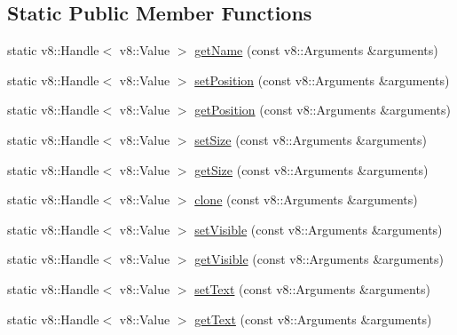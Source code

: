 \subsection*{Static Public Member Functions}
\begin{DoxyCompactItemize}
\item 
static v8\-::\-Handle$<$ v8\-::\-Value $>$ \hyperlink{class_rad_xml_1_1_app_object_class_ab8ecea2d5f0262244603882c1ad13cea}{get\-Name} (const v8\-::\-Arguments \&arguments)
\item 
static v8\-::\-Handle$<$ v8\-::\-Value $>$ \hyperlink{class_rad_xml_1_1_app_object_class_a798ac1626cea39cef105c114eadcd942}{set\-Position} (const v8\-::\-Arguments \&arguments)
\item 
static v8\-::\-Handle$<$ v8\-::\-Value $>$ \hyperlink{class_rad_xml_1_1_app_object_class_aed23d09c6caa9c185f340ed529699871}{get\-Position} (const v8\-::\-Arguments \&arguments)
\item 
static v8\-::\-Handle$<$ v8\-::\-Value $>$ \hyperlink{class_rad_xml_1_1_app_object_class_a14e33a9cf71cde67de665e76c9f5ce77}{set\-Size} (const v8\-::\-Arguments \&arguments)
\item 
static v8\-::\-Handle$<$ v8\-::\-Value $>$ \hyperlink{class_rad_xml_1_1_app_object_class_a4525099d300eaf5a1fa495551a2b43bb}{get\-Size} (const v8\-::\-Arguments \&arguments)
\item 
static v8\-::\-Handle$<$ v8\-::\-Value $>$ \hyperlink{class_rad_xml_1_1_app_object_class_a24659ee0745d9c77da42433d73303230}{clone} (const v8\-::\-Arguments \&arguments)
\item 
static v8\-::\-Handle$<$ v8\-::\-Value $>$ \hyperlink{class_rad_xml_1_1_app_object_class_a1334cb784a66c9afb266452d367a2bf4}{set\-Visible} (const v8\-::\-Arguments \&arguments)
\item 
static v8\-::\-Handle$<$ v8\-::\-Value $>$ \hyperlink{class_rad_xml_1_1_app_object_class_abec11271040f1bdaa193caf2d0b347cb}{get\-Visible} (const v8\-::\-Arguments \&arguments)
\item 
static v8\-::\-Handle$<$ v8\-::\-Value $>$ \hyperlink{class_rad_xml_1_1_app_object_class_a4080ae649b25eda94779d72b1390284b}{set\-Text} (const v8\-::\-Arguments \&arguments)
\item 
static v8\-::\-Handle$<$ v8\-::\-Value $>$ \hyperlink{class_rad_xml_1_1_app_object_class_ac7f41808029fd328d34b22fa51fab5e0}{get\-Text} (const v8\-::\-Arguments \&arguments)
\end{DoxyCompactItemize}


